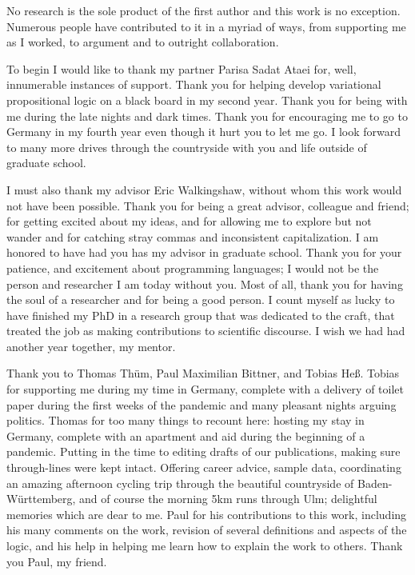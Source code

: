 No research is the sole product of the first author and this work is no
exception. Numerous people have contributed to it in a myriad of ways, from
supporting me as I worked, to argument and to outright collaboration.

To begin I would like to thank my partner Parisa Sadat Ataei for, well,
innumerable instances of support. Thank you for helping develop variational
propositional logic on a black board in my second year. Thank you for being with
me during the late nights and dark times. Thank you for encouraging me to go to
Germany in my fourth year even though it hurt you to let me go. I look forward
to many more drives through the countryside with you and life outside of
graduate school.

I must also thank my advisor Eric Walkingshaw, without whom this work would not
have been possible. Thank you for being a great advisor, colleague and friend;
for getting excited about my ideas, and for allowing me to explore but not
wander and for catching stray commas and inconsistent capitalization. I am
honored to have had you has my advisor in graduate school. Thank you for your
patience, and excitement about programming languages; I would not be the person
and researcher I am today without you. Most of all, thank you for having the
soul of a researcher and for being a good person. I count myself as lucky to
have finished my PhD in a research group that was dedicated to the craft, that
treated the job as making contributions to scientific discourse. I wish we had
had another year together, my mentor.

Thank you to Thomas Thüm, Paul Maximilian Bittner, and Tobias Heß. Tobias for
supporting me during my time in Germany, complete with a delivery of toilet
paper during the first weeks of the pandemic and many pleasant nights arguing
politics. Thomas for too many things to recount here: hosting my stay in
Germany, complete with an apartment and aid during the beginning of a pandemic.
Putting in the time to editing drafts of our publications, making sure
through-lines were kept intact. Offering career advice, sample data,
coordinating an amazing afternoon cycling trip through the beautiful countryside
of Baden-Württemberg, and of course the morning 5km runs through Ulm; delightful
memories which are dear to me. Paul for his contributions to this work,
including his many comments on the work, revision of several definitions and
aspects of the logic, and his help in helping me learn how to explain the work
to others. Thank you Paul, my friend.

